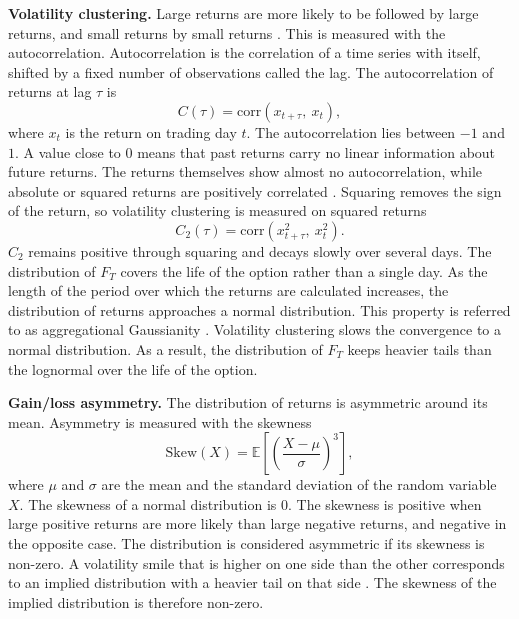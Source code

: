 \textbf{Volatility clustering.} Large returns are more likely to be followed by large returns, and small returns by small returns \parencite{contEmpiricalPropertiesAsset2001}. This is measured with the autocorrelation. Autocorrelation is the correlation of a time series with itself, shifted by a fixed number
of observations called the lag. The autocorrelation of returns at lag $\tau$ is 
\begin{equation}
    C(\tau) = \mathrm{corr}\!\left( x_{t+\tau},\ x_{t} \right),
    \label{eq:autocorrelation}
\end{equation}
where $x_t$ is the return on trading day $t$. The autocorrelation lies between $-1$ and $1$. A value close to $0$ means that past returns carry no linear information about future returns. The returns themselves show almost no autocorrelation, while absolute or squared returns are positively correlated \parencite{contEmpiricalPropertiesAsset2001}. Squaring removes the sign of the return, so volatility clustering is measured on squared returns
\begin{equation}
    C_2(\tau) = \mathrm{corr}\!\left( x_{t+\tau}^{2},\ x_{t}^{2} \right).
    \label{eq:vol-clustering}
\end{equation}
$C_2$ remains positive through squaring and decays slowly over several days. The distribution of $F_T$ covers the life of the option rather than a single day. As the length of the period over which the returns are calculated increases, the distribution of returns approaches a normal distribution. This property is referred to as aggregational Gaussianity \parencite{contEmpiricalPropertiesAsset2001}. Volatility clustering slows the convergence to a normal distribution. As a result, the distribution of $F_T$ keeps heavier tails than the lognormal over the life of the option.

\textbf{Gain/loss asymmetry.} The distribution of returns is asymmetric around its mean. Asymmetry is measured with the skewness
\begin{equation}
    \mathrm{Skew}(X) = \mathbb{E}\!\left[\left(\frac{X-\mu}{\sigma}\right)^{3}\right],
    \label{eq:skewness}
\end{equation}
where $\mu$ and $\sigma$ are the mean and the standard deviation of the random variable $X$. The skewness of a normal distribution is 0. The skewness is positive when large positive returns are more likely than large negative returns, and negative in the opposite case. The distribution is considered asymmetric if its skewness is non-zero. A volatility smile that is higher on one side than the other corresponds to an implied distribution with a heavier tail on that side \parencite[456]{hullOptionsFuturesOther2022}. The skewness of the implied distribution is therefore non-zero.

